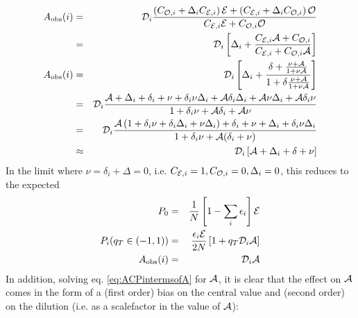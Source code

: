 \documentclass[a4paper,10pt,twosided]{article}
\begin{document}
\begin{eqnarray}
  A_{\mathrm{obs}}(i) &=&  {\cal D}_i \frac{\left(C_{{\cal O},i}+{\Delta}_i C_{{\cal E},i}\right) {\cal E}+\left( C_{{\cal E},i} + {\Delta}_i C_{{\cal O},i} \right){\cal O}}
                               { C_{{\cal E},i}{\cal E}+ C_{{\cal O},i}{\cal O} }
\\  &=& {\cal D}_i \left[ \Delta_i + \frac{C_{{\cal E},i}{\cal A}+C_{{\cal O},i} }{ C_{{\cal E},i} + C_{{\cal O},i}{\cal A} }\right]
\\A_{\mathrm{obs}}(i) &=&    {\cal D}_i \left[ \Delta_i + \frac{\delta+\frac{\nu+{\cal A}}{1+\nu{\cal A}}}{1+\delta\frac{\nu+{\cal A}}{1+\nu{\cal A}}}\right] 
\\          &=&    {\cal D}_i \frac{ {\cal A}+\Delta_i +\delta_i + \nu + \delta_i\nu\Delta_i + {\cal A}\delta_i\Delta_i + {\cal A}\nu\Delta_i + {\cal A} \delta_i\nu }{1 +\delta_i\nu + {\cal A}\delta_i + {\cal A}\nu}
\\          &=&    {\cal D}_i \frac{ {\cal A}\left(1 + \delta_i \nu +\delta_i\Delta_i + \nu\Delta_i \right)  +\delta_i + \nu+\Delta_i + \delta_i\nu\Delta_i  }{1 +\delta_i\nu + {\cal A}( \delta_i +\nu)}
\\       &\approx& {\cal D}_i \left[ {\cal A} + \Delta_i + \delta + \nu \right]
\end{eqnarray}
In the limit where $\nu=\delta_i+{\Delta}=0$, i.e. $C_{{\cal E},i} =1, C_{{\cal O},i}=0, \Delta_i = 0$, this reduces to the expected
\begin{eqnarray}
   P_0 &=&\frac{1}{N} \left[ 1-\sum_i \epsilon_i \right]{\cal E} \\
   P_i(q_T\in(-1,1)) &=& \frac{\epsilon_i{\cal E}}{2N}\left[ 1  +q_T {\cal D}_i {\cal A}\right]  \label{eq:substrule_s}\\
   A_{\mathrm{obs}}(i) &=&   {\cal D}_i {\cal A}
\end{eqnarray}
In addition, solving eq. \ref{eq:ACPintermsofA} for $\cal A$, it is clear that the effect on ${\cal A}$ comes in the form of a (first order) bias on the central value and (second order) on the dilution (i.e. as a scalefactor in the value of ${\cal A}$):
\end{document}

